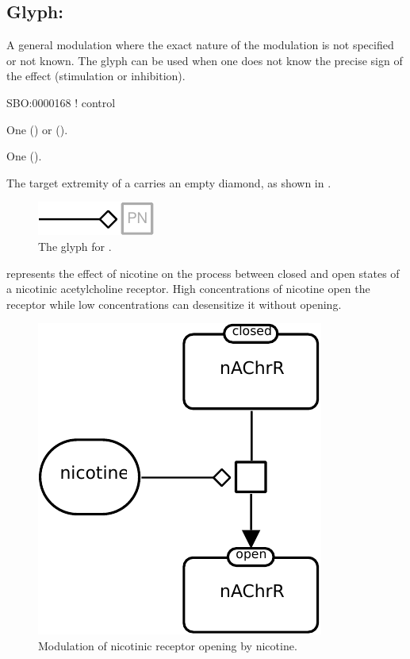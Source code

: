 \subsection{Glyph: }
\label{sec:modulation}

A general modulation where the exact nature of the modulation is not specified or not known.
The  glyph can be used when one does not know the precise sign of the effect (stimulation or inhibition).

\begin{glyphDescription}

\glyphSboTerm
SBO:0000168 ! control

\glyphOrigin
One  () or   ().

\glyphTarget
One  ().

\glyphSymbol
The target extremity of a  carries an empty diamond, as shown in .

\end{glyphDescription}

\begin{figure}[H]
  \centering
  \includegraphics{images/build/modulation.pdf}
  \caption{The \PD glyph for .}
  \label{fig:modulation}
\end{figure}

 represents the effect of nicotine on the process between closed and open states of a nicotinic acetylcholine receptor. High concentrations of nicotine open the receptor while low concentrations can desensitize it without opening.

\begin{figure}[H]
  \centering
  \includegraphics[scale = 0.8]{images/build/modulation_nAChR_example.pdf}
  \caption{Modulation of nicotinic receptor opening by nicotine.}
  \label{fig:modul-nico}
\end{figure}
